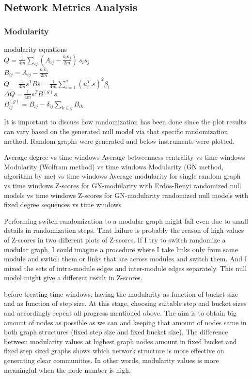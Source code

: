 \subsection*{Network Metrics Analysis}
%
\subsubsection*{Modularity}
modularity equations\\
$Q = \frac {1} {4 m}\sum_ {ij} (A_{ij} - \frac {k_{i} k_{j}}{2 m}) \
s_{i} s_{j}$\\
$B_{ij} = A_{ij} - \frac {k_ {i} k_ {j}} {2 m}$\\
$Q = \frac {1} {4 m} s^{T} Bs = \frac {1} {4 m}\sum_ {i = 
	1}^{n} (u_ {i}^{T} . s)^{2}\beta_ {i}$\\
$\Delta Q = \frac {1} {4 m} s^{T} B^{(g)} s$\\
$B_{ij}^{(g)} = B_{ij} - \delta_{ij}\sum_ {k\in g} B_{ik}$

It is important to discuss how randomization has been done since the plot results can vary based on the generated null model via that specific randomization method. 
Random graphs were generated and below instruments were plotted.

Average degree vs time windows
Average betweenness centrality vs time windows
Modularity (Wolfram method) vs time windows
Modularity (GN method, algorithm by me) vs time windows
Average modularity for single random graph vs time windows
Z-scores for GN-modularity with Erdös-Renyi randomized null models vs time windows
Z-scores for GN-modularity randomized null models with fixed degree sequences vs time windows

Performing switch-randomization to a modular graph might fail even due to small details in randomization steps. That failure is probably the reason of high values of Z-scores in two different plots of Z-scores. If I try to switch randomize a modular graph, I could imagine a procedure where I take links only from same module and switch them or links that are across modules and switch them. And I mixed the sets of intra-module edges and inter-module edges separately. This null model might give a different result in Z-scores.

before treating time windows, having the modularity as function of bucket size and as function of step size. At this stage, choosing suitable step and bucket sizes and accordingly repeat all progress mentioned above. The aim is to obtain big amount of nodes as possible as we can and keeping that amount of nodes same in both graph structures (fixed step size and fixed bucket size). The difference between modularity values at highest graph nodes amount in fixed bucket and fixed step sized graphs shows which network structure is more effective on generating clear communities. In other words, modularity values is more meaningful when the node number is high.

